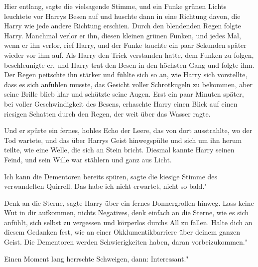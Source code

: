 \glqq Hier entlang\grqq{}, sagte die vielsagende Stimme, und ein Funke grünen
Lichts leuchtete vor Harrys Besen auf und huschte dann in eine Richtung davon,
die Harry wie jede andere Richtung erschien. Durch den blendenden Regen folgte
Harry. Manchmal verlor er ihn, diesen kleinen grünen Funken, und jedes Mal, wenn
er ihn verlor, rief Harry, und der Funke tauchte ein paar Sekunden später wieder
vor ihm auf. Als Harry den Trick verstanden hatte, dem Funken zu folgen,
beschleunigte er, und Harry trat den Besen in den höchsten Gang und folgte ihm.
Der Regen peitschte ihn stärker und fühlte sich so an, wie Harry sich
vorstellte, dass es sich anfühlen musste, das Gesicht voller Schrotkugeln zu
bekommen, aber seine Brille blieb klar und schützte seine Augen. Erst ein paar
Minuten später, bei voller Geschwindigkeit des Besens, erhaschte Harry einen
Blick auf einen riesigen Schatten durch den Regen, der weit über das Wasser
ragte.

Und er spürte ein fernes, hohles Echo der Leere, das von dort ausstrahlte, wo
der Tod wartete, und das über Harrys Geist hinwegspülte und sich um ihn herum
teilte, wie eine Welle, die sich an Stein bricht. Diesmal kannte Harry seinen
Feind, und sein Wille war stählern und ganz aus Licht.

\glqq Ich kann die Dementoren bereits spüren\grqq{}, sagte die kiesige Stimme
des verwandelten Quirrell. \glqq Das habe ich nicht erwartet, nicht so bald."

\glqq Denk an die Sterne\grqq{}, sagte Harry über ein fernes Donnergrollen
hinweg. \glqq Lass keine Wut in dir aufkommen, nichts Negatives, denk einfach an
die Sterne, wie es sich anfühlt, sich selbst zu vergessen und körperlos durchs
All zu fallen. Halte dich an diesem Gedanken fest, wie an einer
Okklumentikbarriere über deinem ganzen Geist. Die Dementoren werden
Schwierigkeiten haben, daran vorbeizukommen."

Einen Moment lang herrschte Schweigen, dann: \glqq Interessant."

